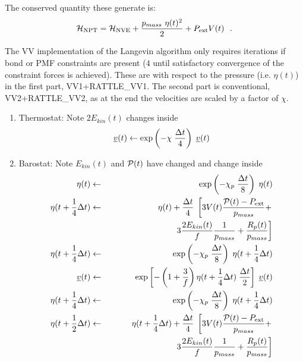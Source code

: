 The conserved quantity these generate is:
\begin{equation}
{\cal H}_{\rm NPT} = {\cal H}_{\rm NVE} + {p_{mass}~\eta (t)^{2} \over 2} + P_{\rm ext} V(t)~~.
\end{equation}

The VV implementation of the Langevin algorithm only requires iterations
if bond or PMF constraints are present ($4$ until satisfactory
convergence of the constraint forces is achieved).  These are
with respect to the pressure (i.e. $\eta (t)$) in the first part,
VV1+RATTLE\_VV1.  The second part is conventional, VV2+RATTLE\_VV2,
as at the end the velocities are scaled by a factor of $\chi$.
\begin{enumerate}
\item Thermostat: Note $2 E_{kin}(t)$ changes inside
\begin{equation}
\mbox{$\underline{v}$}(t) \leftarrow \exp \left( -\chi \; {\Delta t \over 4} \right) \; \mbox{$\underline{v}$}(t)
\end{equation}
\item Barostat: Note $E_{kin}(t)$ and ${\cal P}(t)$ have changed and change inside
\begin{eqnarray}
\eta (t) &\leftarrow& \exp \left( -\chi_{p} \; {\Delta t \over 8} \right) \;
\eta (t)\nonumber \\
\eta (t + {1 \over 4} \Delta t) &\leftarrow& \eta (t) + {\Delta t \over 4} \;
\left[ 3 V(t) \frac{{\cal P}(t) - P_{\rm ext}}{p_{mass}} + \right. \nonumber \\
&& ~~~~~~~~~~~~~~~~~~~~~~~~\left. 3 \frac{2 E_{kin}(t)}{f} \frac{1}{p_{mass}} + \frac{R_{p}(t)}{p_{mass}} \right] \nonumber \\
\eta (t + {1 \over 4} \Delta t) &\leftarrow& \exp \left( -\chi_{p} \; {\Delta t \over 8} \right)  \;
\eta (t + {1 \over 4} \Delta t) \nonumber \\
\vek{v}(t) &\leftarrow& \exp \left[ -\left( 1 + \frac{3}{f} \right)
\eta (t + {1 \over 4}\Delta t) \; {\Delta t \over 2} \right] \; \vek{v}(t) \\
\eta (t + {1 \over 4} \Delta t) &\leftarrow& \exp \left( -\chi_{p} \; {\Delta t \over 8} \right)  \;
\eta (t + {1 \over 4} \Delta t) \nonumber \\
\eta (t + {1 \over 2} \Delta t) &\leftarrow& \eta (t + {1 \over 4} \Delta t) + {\Delta t \over 4} \;
\left[ 3 V(t) \frac{{\cal P}(t) - P_{\rm ext}}{p_{mass}} + \right. \nonumber \\
&& ~~~~~~~~~~~~~~~~~~~~~~~~\left. 3 \frac{2 E_{kin}(t)}{f} \frac{1}{p_{mass}} + \frac{R_{p}(t)}{p_{mass}} \right] \nonumber \\

\end{eqnarray}
\end{enumerate}
